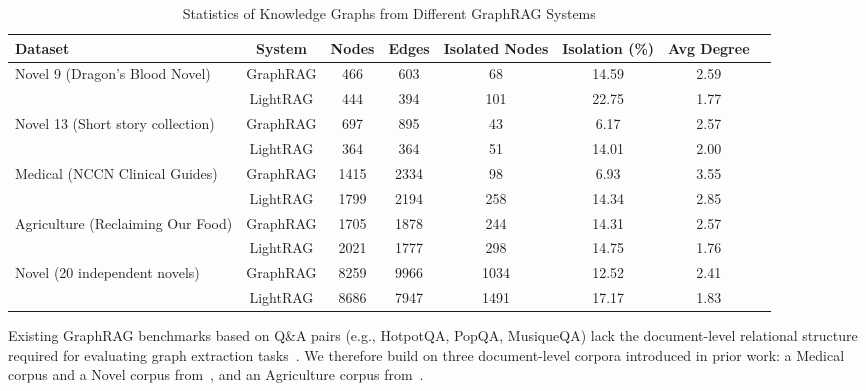 \begin{table}[t]
\centering
\caption{Statistics of Knowledge Graphs from Different GraphRAG Systems}
\label{tab:graph_stats}
\small
\begin{tabular}{lccccccc}
\toprule
\textbf{Dataset} & \textbf{System} & \textbf{Nodes} & \textbf{Edges} & \textbf{Isolated Nodes} & \textbf{Isolation (\%)} & \textbf{Avg Degree} \\
\midrule
\multirow{2}{*}{Novel 9 (Dragon's Blood Novel)}
& GraphRAG & 466 & 603 & 68 & 14.59 & 2.59 \\
& LightRAG & 444 & 394 & 101 & 22.75 & 1.77 \\
\midrule
\multirow{2}{*}{Novel 13 (Short story collection)}
& GraphRAG & 697 & 895 & 43 & 6.17 & 2.57 \\
& LightRAG & 364 & 364 & 51 & 14.01 & 2.00 \\
\midrule
\multirow{2}{*}{Medical (NCCN Clinical Guides)}
& GraphRAG & 1415 & 2334 & 98 & 6.93 & 3.55 \\
& LightRAG & 1799 & 2194 & 258 & 14.34 & 2.85 \\
\midrule
\multirow{2}{*}{Agriculture (Reclaiming Our Food)}
& GraphRAG & 1705 & 1878& 244 &14.31 &2.57\\
& LightRAG & 2021 & 1777 & 298 & 14.75 & 1.76\\
\midrule
\multirow{2}{*}{Novel (20 independent novels)}
& GraphRAG &8259&9966&1034&12.52&2.41 \\
& LightRAG &8686&	7947	&1491	&17.17	&1.83 \\
\bottomrule
\end{tabular}
\end{table}
Existing GraphRAG benchmarks based on Q\&A pairs (e.g., HotpotQA, PopQA, MusiqueQA) lack the document-level relational structure required for evaluating graph extraction tasks~\cite{xiao2025graphrag}. We therefore build on three document-level corpora introduced in prior work: a Medical corpus and a Novel corpus from~\cite{xiang2025use}, and an Agriculture corpus from~\cite{zhou2025depth}.

